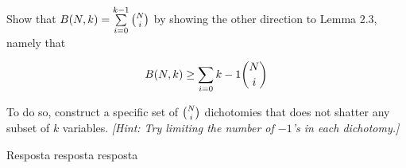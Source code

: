 \begin{enunciado}{4}
    Show that $B(N, k) = \sum\limits_{i=0}^{k-1} {{N} \choose {i}}$ by showing
    the other direction to Lemma 2.3, namely that
    
    $$ B(N, k) \ge \sum\limits_{i=0}{k-1} {{N} \choose {i}} $$
    
    To do so, construct a specific set of ${{N} \choose {i}}$ dichotomies that
    does not shatter any subset of $k$ variables. \textit{[Hint: Try limiting the number of $-1$'s in each dichotomy.]}
    
\end{enunciado}

Resposta resposta resposta